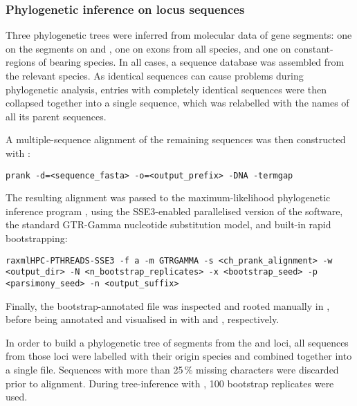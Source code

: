 \subsubsection{Phylogenetic inference on \igh{} locus sequences}
\label{sec:methods_comp_trees_phylo}

Three phylogenetic trees were inferred from molecular data of  gene segments: one on the \vh segments on \nfu and \xma, one on \ch exons from all species, and one on  constant-regions of  bearing species. In all cases, a sequence  database was assembled from the relevant species. As identical sequences can cause problems during phylogenetic analysis, entries with completely identical sequences  were then collapsed together into a single  sequence, which was relabelled with the names of all its parent sequences. 

A multiple-sequence alignment of the remaining sequences was then constructed with :

\begin{lstlisting}
prank -d=<sequence_fasta> -o=<output_prefix> -DNA -termgap
\end{lstlisting}

\noindent The resulting alignment was passed to the maximum-likelihood phylogenetic inference program  \parencite{stamatakis2005raxml3,stamatakis2006raxml6,stamatakis2014raxml8}, using the SSE3-enabled parallelised version of the software, the standard GTR-Gamma nucleotide substitution model, and built-in rapid bootstrapping:

\begin{lstlisting}
raxmlHPC-PTHREADS-SSE3 -f a -m GTRGAMMA -s <ch_prank_alignment> -w <output_dir> -N <n_bootstrap_replicates> -x <bootstrap_seed> -p <parsimony_seed> -n <output_suffix>
\end{lstlisting} 

\noindent Finally, the bootstrap-annotated  file was inspected and rooted manually in  \parencite{rambaut2012figtree}, before being annotated and visualised in  with  and , respectively.


\noindent In order to build a phylogenetic tree of \vh segments from the \Nfu and \Xma \igh{} loci, all \vh sequences from those loci were labelled with their origin species and combined together into a single  file. Sequences with more than 25\,\% missing characters were discarded prior to  alignment. During tree-inference with , 100 bootstrap replicates were used.

